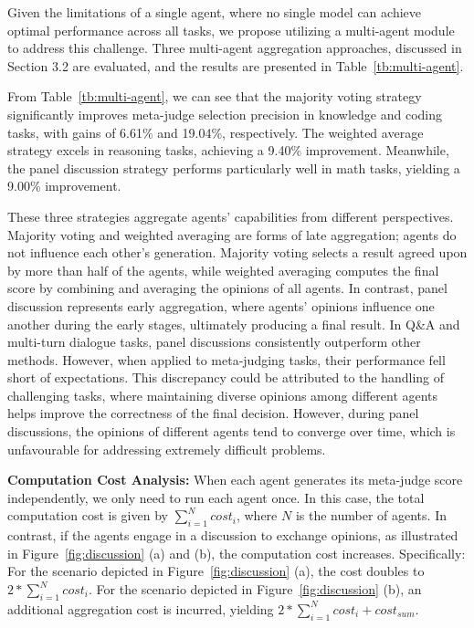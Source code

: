 \documentclass{article}
\theoremstyle{plain}
\theoremstyle{definition}
\theoremstyle{remark}
\begin{document}
Given the limitations of a single agent, where no single model can achieve optimal performance across all tasks, we propose utilizing a multi-agent module to address this challenge. Three multi-agent aggregation approaches, discussed in Section 3.2 are evaluated, and the results are presented in Table~\ref{tb:multi-agent}.

From Table~\ref{tb:multi-agent}, we can see that the majority voting strategy significantly improves meta-judge selection precision in knowledge and coding tasks, with gains of 6.61\% and 19.04\%, respectively. The weighted average strategy excels in reasoning tasks, achieving a 9.40\% improvement. Meanwhile, the panel discussion strategy performs particularly well in math tasks, yielding a 9.00\% improvement. 

These three strategies aggregate agents' capabilities from different perspectives. Majority voting and weighted averaging are forms of late aggregation; agents do not influence each other's generation. Majority voting selects a result agreed upon by more than half of the agents, while weighted averaging computes the final score by combining and averaging the opinions of all agents. In contrast, panel discussion represents early aggregation, where agents' opinions influence one another during the early stages, ultimately producing a final result. 
In Q\&A and multi-turn dialogue tasks, panel discussions consistently outperform other methods. However, when applied to meta-judging tasks, their performance fell short of expectations. 
This discrepancy could be attributed to the handling of challenging tasks, where maintaining diverse opinions among different agents helps improve the correctness of the final decision. However, during panel discussions, the opinions of different agents tend to converge over time, which is unfavourable for addressing extremely difficult problems.

\textbf{Computation Cost Analysis:} When each agent generates its meta-judge score independently, we only need to run each agent once. In this case, the total computation cost is given by $\sum_{i=1}^{N} cost_{i}$, where $N$ is the number of agents.
In contrast, if the agents engage in a discussion to exchange opinions, as illustrated in Figure~\ref{fig:discussion} (a) and (b), the computation cost increases. Specifically:
For the scenario depicted in Figure~\ref{fig:discussion} (a), the cost doubles to $2 *\sum_{i=1}^{N} cost_{i}$.
For the scenario depicted in Figure~\ref{fig:discussion} (b), an additional aggregation cost is incurred, yielding $2 *\sum_{i=1}^{N} cost_{i} + cost_{sum}$.
\end{document}
